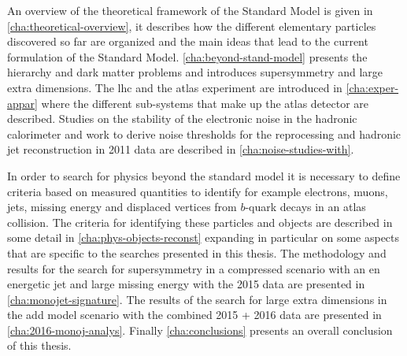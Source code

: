 An overview of the theoretical framework of the Standard Model is given in
\cref{cha:theoretical-overview}, it describes how the different elementary
particles discovered so far are organized and the main ideas that lead to the
current formulation of the Standard Model. \cref{cha:beyond-stand-model}
presents the hierarchy and dark matter problems and introduces supersymmetry and
large extra dimensions. The \gls{lhc} and the \gls{atlas} experiment are
introduced in \cref{cha:exper-appar} where the different sub-systems that make
up the \gls{atlas} detector are described. Studies on the stability of the
electronic noise in the hadronic calorimeter and work to derive noise thresholds
for the reprocessing and hadronic jet reconstruction in 2011 data are described
in \cref{cha:noise-studies-with}.

In order to search for physics beyond the standard model it is necessary to
define criteria based on measured quantities to identify for example electrons,
muons, jets, missing energy and displaced vertices from $b$-quark decays in an
\gls{atlas} collision. The criteria for identifying these particles and objects
are described in some detail in \cref{cha:phys-objects-reconst} expanding in
particular on some aspects that are specific to the searches presented in this
thesis. The methodology and results for the search for supersymmetry in a
compressed scenario with an en energetic jet and large missing energy with the
2015 data are presented in \cref{cha:monojet-signature}. The results of the
search for large extra dimensions in the \gls{add} model scenario with the
combined 2015 + 2016 data are presented in \cref{cha:2016-monoj-analys}. Finally
\cref{cha:conclusions} presents an overall conclusion of this thesis.
